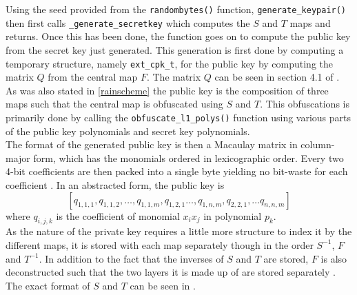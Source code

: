 Using the seed provided from the \texttt{randombytes()} function, \texttt{generate\_keypair()} then first calls \texttt{\_generate\_secretkey} which computes the $S$ and $T$ maps and returns. Once this has been done, the function goes on to compute the public key from the secret key just generated. This generation is first done by computing a temporary structure, namely \texttt{ext\_cpk\_t}, for the public key by computing the matrix $Q$ from the central map $F$. The matrix $Q$ can be seen in section 4.1 of \cite{rainbownist}. As was also stated in \cref{rainscheme} the public key is the composition of three maps such that the central map is obfuscated using $S$ and $T$. This obfuscations is primarily done by calling the \texttt{obfuscate\_l1\_polys()} function using various parts of the public key polynomials and secret key polynomials.
\medskip\\
The format of the generated public key is then a Macaulay matrix in column-major form, which has the monomials ordered in lexicographic order. Every two 4-bit coefficients are then packed into a single byte yielding no bit-waste for each coefficient \cite{rainbownist}. In an abstracted form, the public key is
$$
    [q_{1,1,1}, q_{1,1,2}, \dots,q_{1,1,m},q_{1,2,1} \dots , q_{1,n,m}, q_{2,2,1}, \dots q_{n,n,m}]
$$
where $q_{i,j,k}$ is the coefficient of monomial $x_ix_j$ in polynomial $p_k$.\medskip\\
As the nature of the private key requires a little more structure to index it by the different maps, it is stored with each map separately though in the order $S^{-1}$, $F$ and $T^{-1}$. In addition to the fact that the inverses of $S$ and $T$ are stored, $F$ is also deconstructed such that the two layers it is made up of are stored separately \cite{rainbownist}. The exact format of $S$ and $T$ can be seen in \cite{rainbownist}.
